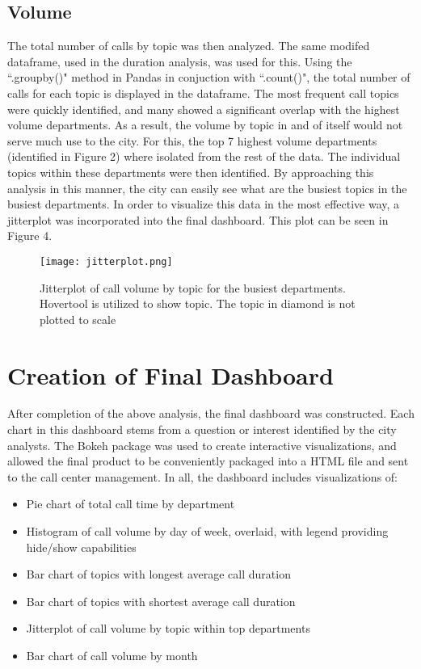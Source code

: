 \documentclass[11pt,twocolumn]{article}
\begin{document}
\subsection{Volume}
The total number of calls by topic was then analyzed.  The same modifed dataframe, used in the duration analysis, was used for this.  Using the ``.groupby()" method in Pandas in conjuction with ``.count()", the total number of calls for each topic is displayed in the dataframe.  The most frequent call topics were quickly identified, and many showed a significant overlap with the highest volume departments.  As a result, the volume by topic in and of itself would not serve much use to the city.  For this, the top 7 highest volume departments (identified in Figure 2) where isolated from the rest of the data.  The individual topics within these departments were then identified.  By approaching this analysis in this manner, the city can easily see what are the busiest topics in the busiest departments.  In order to visualize this data in the most effective way, a jitterplot was incorporated into the final dashboard.  This plot can be seen in Figure 4.
\begin{figure}[h]
  \texttt{[image: jitterplot.png]}
  \caption{Jitterplot of call volume by topic for the busiest departments.  Hovertool is utilized to show topic.  The topic in diamond is not plotted to scale}
\end{figure}

\section{Creation of Final Dashboard}
After completion of the above analysis, the final dashboard was constructed.  Each chart in this dashboard stems from a question or interest identified by the city analysts.  The Bokeh package was used to create interactive visualizations, and allowed the final product to be conveniently packaged into a HTML file and sent to the call center management.  In all, the dashboard includes visualizations of:

\begin{itemize}
  \item{Pie chart of total call time by department}
  \item{Histogram of call volume by day of week, overlaid, with legend providing hide/show capabilities}
  \item{Bar chart of topics with longest average call duration}
  \item{Bar chart of topics with shortest average call duration}
  \item{Jitterplot of call volume by topic within top departments}
  \item{Bar chart of call volume by month}
\end{itemize}
\end{document}
